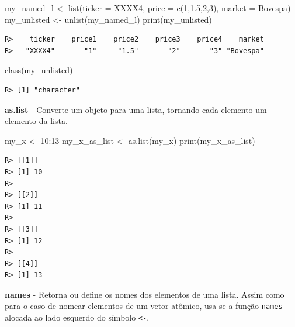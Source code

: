 \documentclass[
  11pt,
]{book}
\newenvironment{Shaded}{\begin{snugshade}}{\end{snugshade}}
\newcommand{\AttributeTok}[1]{\textcolor[rgb]{0.61,0.61,0.61}{#1}}
\newcommand{\DecValTok}[1]{\textcolor[rgb]{0.06,0.06,0.06}{#1}}
\newcommand{\FloatTok}[1]{\textcolor[rgb]{0.06,0.06,0.06}{#1}}
\newcommand{\FunctionTok}[1]{\textcolor[rgb]{0,0,0}{#1}}
\newcommand{\NormalTok}[1]{#1}
\newcommand{\OtherTok}[1]{\textcolor[rgb]{0.37,0.37,0.37}{#1}}
\newcommand{\SpecialCharTok}[1]{\textcolor[rgb]{0,0,0}{#1}}
\newcommand{\StringTok}[1]{\textcolor[rgb]{0.5,0.5,0.5}{#1}}
\begin{document}
\begin{Shaded}
\begin{Highlighting}[]
\NormalTok{my\_named\_l }\OtherTok{\textless{}{-}} \FunctionTok{list}\NormalTok{(}\AttributeTok{ticker =} \StringTok{\textquotesingle{}XXXX4\textquotesingle{}}\NormalTok{,}
                   \AttributeTok{price =} \FunctionTok{c}\NormalTok{(}\DecValTok{1}\NormalTok{,}\FloatTok{1.5}\NormalTok{,}\DecValTok{2}\NormalTok{,}\DecValTok{3}\NormalTok{),}
                   \AttributeTok{market =} \StringTok{\textquotesingle{}Bovespa\textquotesingle{}}\NormalTok{)}
\NormalTok{my\_unlisted }\OtherTok{\textless{}{-}} \FunctionTok{unlist}\NormalTok{(my\_named\_l)}
\FunctionTok{print}\NormalTok{(my\_unlisted)}
\end{Highlighting}
\end{Shaded}

\begin{verbatim}
R>    ticker    price1    price2    price3    price4    market 
R>   "XXXX4"       "1"     "1.5"       "2"       "3" "Bovespa"
\end{verbatim}

\begin{Shaded}
\begin{Highlighting}[]
\FunctionTok{class}\NormalTok{(my\_unlisted)}
\end{Highlighting}
\end{Shaded}

\begin{verbatim}
R> [1] "character"
\end{verbatim}

\textbf{as.list} - Converte um objeto para uma lista, tornando cada elemento um elemento da lista.

\begin{Shaded}
\begin{Highlighting}[]
\NormalTok{my\_x }\OtherTok{\textless{}{-}} \DecValTok{10}\SpecialCharTok{:}\DecValTok{13}
\NormalTok{my\_x\_as\_list }\OtherTok{\textless{}{-}} \FunctionTok{as.list}\NormalTok{(my\_x)}
\FunctionTok{print}\NormalTok{(my\_x\_as\_list)}
\end{Highlighting}
\end{Shaded}

\begin{verbatim}
R> [[1]]
R> [1] 10
R> 
R> [[2]]
R> [1] 11
R> 
R> [[3]]
R> [1] 12
R> 
R> [[4]]
R> [1] 13
\end{verbatim}

\textbf{names} - Retorna ou define os nomes dos elementos de uma lista. Assim como para o caso de nomear elementos de um vetor atômico, usa-se a função \texttt{names} alocada ao lado esquerdo do símbolo \texttt{\textless{}-}.
\end{document}
